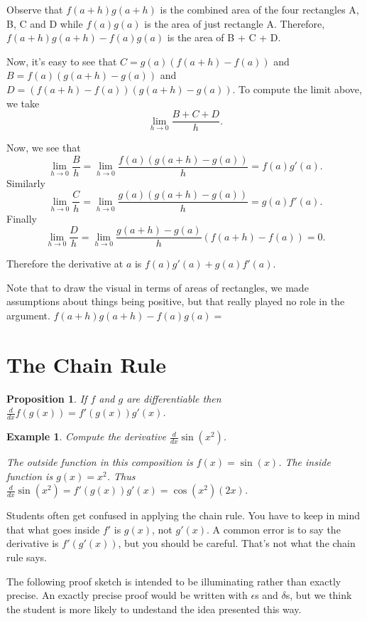 \documentclass[11pt]{book}
\newcounter{error}[chapter]
\newtheorem{prop}{Proposition}
\newtheorem{example}{Example}
\numberwithin{example}{chapter}
\begin{document}
Observe that $f(a+h)g(a+h)$ is the combined area of the four rectangles A, B, C and D while $f(a)g(a)$ is the area of just rectangle A.  Therefore, $f(a+h)g(a+h)-f(a)g(a)$ is the area of B + C + D.  

Now, it's easy to see that $C=g(a)(f(a+h)-f(a))$ and $B=f(a)(g(a+h)-g(a))$ and $D=(f(a+h)-f(a))(g(a+h)-g(a))$.  To compute the limit above, we take 
$$\lim_{h\to 0} \frac{B+C+D}{h}.$$

Now, we see that 
$$\lim_{h\to 0} \frac{B}{h}=\lim_{h\to 0} \frac{f(a)(g(a+h)-g(a))}{h}=f(a)g'(a).$$
Similarly
$$\lim_{h\to 0} \frac{C}{h}=\lim_{h\to 0} \frac{g(a)(g(a+h)-g(a))}{h}=g(a)f'(a).$$
Finally
$$\lim_{h\to 0} \frac{D}{h}=\lim_{h\to 0} \frac{g(a+h)-g(a)}{h}(f(a+h)-f(a))=0.$$

Therefore the derivative at $a$ is $f(a)g'(a)+g(a)f'(a)$.

Note that to draw the visual in terms of areas of rectangles, we made assumptions about things being positive, but that really played no role in the argument.  $f(a+h)g(a+h)-f(a)g(a) = $

\section{The Chain Rule}


\begin{prop}
If $f$ and $g$ are differentiable then $\frac{d}{dx}f(g(x)) = f'(g(x))g'(x)$.
\end{prop}

\begin{example}

Compute the derivative $\frac{d}{dx}\sin(x^2)$.

The outside function in this composition is $f(x)=\sin(x)$.  The inside function is $g(x)=x^2$.  Thus $\frac{d}{dx}\sin(x^2) = f'(g(x))g'(x)= \cos(x^2)(2x)$.

\end{example}

\begin{error}
Students often get confused in applying the chain rule.  You have to keep in mind that what goes inside $f'$ is $g(x)$, not $g'(x)$.  A common error is to say the derivative is $f'(g'(x))$, but you should be careful.  That's not what the chain rule says.
\end{error}





The following proof sketch is intended to be illuminating rather than exactly precise.  An exactly precise proof would be written with $\epsilon$s and $\delta$s, but we think the student is more likely to undestand the idea presented this way.
\end{document}
